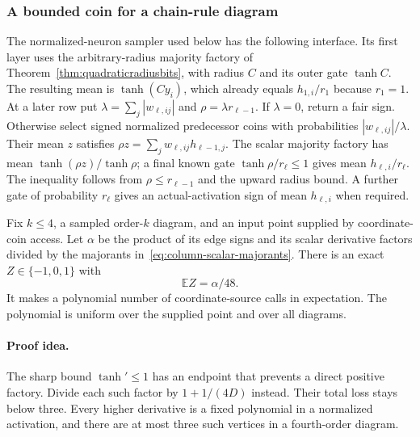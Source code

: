 \subsubsection{A bounded coin for a chain-rule diagram}

The normalized-neuron sampler used below has the following interface.
Its first layer uses the arbitrary-radius majority factory of
Theorem~\ref{thm:quadraticradiusbits}, with radius $C$ and its outer
gate $\tanh C$.  The resulting mean is $\tanh(Cy_i)$, which already
equals $h_{1,i}/r_1$ because $r_1=1$.
At a later row put $\lambda=\sum_j|w_{\ell,ij}|$ and
$\rho=\lambda r_{\ell-1}$.  If $\lambda=0$, return a fair sign.
Otherwise select signed normalized predecessor coins with probabilities
$|w_{\ell,ij}|/\lambda$.  Their mean $z$ satisfies
$\rho z=\sum_jw_{\ell,ij}h_{\ell-1,j}$.
The scalar majority factory has mean
$\tanh(\rho z)/\tanh\rho$; a final known gate
$\tanh\rho/r_\ell\le1$ gives mean $h_{\ell,i}/r_\ell$.
The inequality follows from $\rho\le r_{\ell-1}$ and the upward
radius bound.  A further gate of probability $r_\ell$ gives an
actual-activation sign of mean $h_{\ell,i}$ when required.

\begin{lemma}
\label{lem:column-diagram-coin}
Fix $k\le4$, a sampled order-$k$ diagram, and an input point supplied
by coordinate-coin access.  Let $\alpha$ be the product of its edge
signs and its scalar derivative factors divided by the
majorants in~\eqref{eq:column-scalar-majorants}.  There is an exact
$Z\in\{-1,0,1\}$ with
\[
 \mathbb E Z=\alpha/48.
\]
It makes a polynomial number of coordinate-source calls in expectation.
The polynomial is uniform over the supplied point and over all diagrams.
\end{lemma}

\paragraph{Proof idea.}
The sharp bound $\tanh'\le1$ has an endpoint that prevents a direct
positive factory.  Divide each such factor by $1+1/(4D)$ instead.
Their total loss stays below three.  Every higher derivative is a
fixed polynomial in a normalized activation, and there are at most
three such vertices in a fourth-order diagram.

